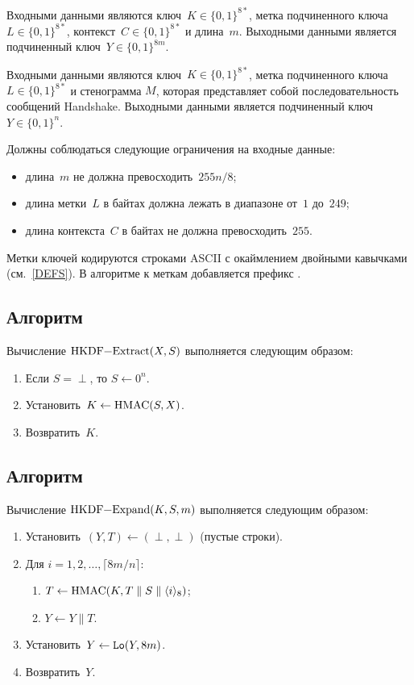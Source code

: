 Входными данными  являются 
ключ~$K\in\{0,1\}^{8*}$, метка подчиненного ключа~$L\in\{0,1\}^{8*}$,
контекст~$C\in\{0,1\}^{8*}$ и длина~$m$. 
%
Выходными данными является подчиненный ключ~$Y\in\{0,1\}^{8m}$.

Входными данными  являются ключ~$K\in\{0,1\}^{8*}$, 
метка подчиненного ключа~$L\in\{0,1\}^{8*}$ и стенограмма $M$, 
которая представляет собой последовательность сообщений Handshake.
%
Выходными данными является подчиненный ключ~$Y\in\{0,1\}^n$.

Должны соблюдаться следующие ограничения на входные данные:
\begin{itemize}
\item
длина~$m$ не должна превосходить~$255n/8$;
\item
длина метки~$L$ в байтах должна лежать в диапазоне от~$1$ до~$249$;
\item
длина контекста~$C$ в байтах не должна превосходить~$255$.
\end{itemize}

Метки ключей кодируются строками ASCII с окаймлением двойными кавычками 
(см.~\ref{DEFS}). В алгоритме  к меткам добавляется 
префикс .

\subsection{Алгоритм }\label{CRYPTO.HKDF.Extract}

Вычисление $\code{HKDF-Extract}(X,S)$ выполняется следующим образом:

\begin{enumerate}
\item
Если $S=\perp$, то $S\gets 0^n$.
\item
Установить~$K\gets\code{HMAC}(S,X)$.
\item
Возвратить~$K$.
\end{enumerate}

\subsection{Алгоритм }\label{CRYPTO.HKDF.Expand}

Вычисление $\code{HKDF-Expand}(K,S,m)$ выполняется следующим образом:

\begin{enumerate}
\item
Установить~$(Y,T)\gets(\perp,\perp)$ (пустые строки).
\item
Для $i=1,2,\ldots,\lceil 8m/n\rceil$:
\begin{enumerate}
\item
$T\gets\code{HMAC}(K,T\parallel S\parallel\itob{i}_8)$;
\item
$Y\gets Y\parallel T$.
\end{enumerate}
\item
Установить~$Y\gets\mathop{\texttt{Lo}}\nolimits(Y,8m)$.
\item
Возвратить~$Y$.
\end{enumerate}

